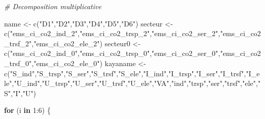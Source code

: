\documentclass[
]{article}
\newenvironment{Shaded}{\begin{snugshade}}{\end{snugshade}}
\newcommand{\CommentTok}[1]{\textcolor[rgb]{0.56,0.35,0.01}{\textit{#1}}}
\newcommand{\ControlFlowTok}[1]{\textcolor[rgb]{0.13,0.29,0.53}{\textbf{#1}}}
\newcommand{\DecValTok}[1]{\textcolor[rgb]{0.00,0.00,0.81}{#1}}
\newcommand{\FunctionTok}[1]{\textcolor[rgb]{0.00,0.00,0.00}{#1}}
\newcommand{\NormalTok}[1]{#1}
\newcommand{\OtherTok}[1]{\textcolor[rgb]{0.56,0.35,0.01}{#1}}
\newcommand{\SpecialCharTok}[1]{\textcolor[rgb]{0.00,0.00,0.00}{#1}}
\newcommand{\StringTok}[1]{\textcolor[rgb]{0.31,0.60,0.02}{#1}}
\begin{document}
\begin{Shaded}
\begin{Highlighting}[]
\CommentTok{\# Decomposition multiplicative}

\NormalTok{name }\OtherTok{\textless{}{-}} \FunctionTok{c}\NormalTok{(}\StringTok{"D1"}\NormalTok{,}\StringTok{"D2"}\NormalTok{,}\StringTok{"D3"}\NormalTok{,}\StringTok{"D4"}\NormalTok{,}\StringTok{"D5"}\NormalTok{,}\StringTok{"D6"}\NormalTok{)}
\NormalTok{secteur }\OtherTok{\textless{}{-}} \FunctionTok{c}\NormalTok{(}\StringTok{"ems\_ci\_co2\_ind\_2"}\NormalTok{,}\StringTok{"ems\_ci\_co2\_trsp\_2"}\NormalTok{,}\StringTok{"ems\_ci\_co2\_ser\_2"}\NormalTok{,}\StringTok{"ems\_ci\_co2\_trsf\_2"}\NormalTok{,}\StringTok{"ems\_ci\_co2\_ele\_2"}\NormalTok{)}
\NormalTok{secteur0 }\OtherTok{\textless{}{-}} \FunctionTok{c}\NormalTok{(}\StringTok{"ems\_ci\_co2\_ind\_0"}\NormalTok{,}\StringTok{"ems\_ci\_co2\_trsp\_0"}\NormalTok{,}\StringTok{"ems\_ci\_co2\_ser\_0"}\NormalTok{,}\StringTok{"ems\_ci\_co2\_trsf\_0"}\NormalTok{,}\StringTok{"ems\_ci\_co2\_ele\_0"}\NormalTok{)}
\NormalTok{kayaname }\OtherTok{\textless{}{-}} \FunctionTok{c}\NormalTok{(}\StringTok{"S\_ind"}\NormalTok{,}\StringTok{"S\_trsp"}\NormalTok{,}\StringTok{"S\_ser"}\NormalTok{,}\StringTok{"S\_trsf"}\NormalTok{,}\StringTok{"S\_ele"}\NormalTok{,}\StringTok{"I\_ind"}\NormalTok{,}\StringTok{"I\_trsp"}\NormalTok{,}\StringTok{"I\_ser"}\NormalTok{,}\StringTok{"I\_trsf"}\NormalTok{,}\StringTok{"I\_ele"}\NormalTok{,}\StringTok{"U\_ind"}\NormalTok{,}\StringTok{"U\_trsp"}\NormalTok{,}\StringTok{"U\_ser"}\NormalTok{,}\StringTok{"U\_trsf"}\NormalTok{,}\StringTok{"U\_ele"}\NormalTok{,}\StringTok{"VA"}\NormalTok{,}\StringTok{"ind"}\NormalTok{,}\StringTok{"trsp"}\NormalTok{,}\StringTok{"ser"}\NormalTok{,}\StringTok{"trsf"}\NormalTok{,}\StringTok{"ele"}\NormalTok{,}\StringTok{"S"}\NormalTok{,}\StringTok{"I"}\NormalTok{,}\StringTok{"U"}\NormalTok{)}

\ControlFlowTok{for}\NormalTok{ (i }\ControlFlowTok{in} \DecValTok{1}\SpecialCharTok{:}\DecValTok{6}\NormalTok{) \{}
  

\end{Highlighting}
\end{Shaded}
\end{document}
